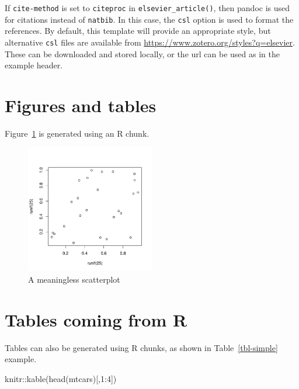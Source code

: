 \documentclass[
  authoryear,
  preprint,
  3p]{elsarticle}
\newenvironment{Shaded}{\begin{snugshade}}{\end{snugshade}}
\newcommand{\DecValTok}[1]{\textcolor[rgb]{0.68,0.00,0.00}{#1}}
\newcommand{\FunctionTok}[1]{\textcolor[rgb]{0.28,0.35,0.67}{#1}}
\newcommand{\NormalTok}[1]{\textcolor[rgb]{0.00,0.23,0.31}{#1}}
\newcommand{\SpecialCharTok}[1]{\textcolor[rgb]{0.37,0.37,0.37}{#1}}
\begin{document}
If \texttt{cite-method} is set to \texttt{citeproc} in
\texttt{elsevier\_article()}, then pandoc is used for citations instead
of \texttt{natbib}. In this case, the \texttt{csl} option is used to
format the references. By default, this template will provide an
appropriate style, but alternative \texttt{csl} files are available from
\url{https://www.zotero.org/styles?q=elsevier}. These can be downloaded
and stored locally, or the url can be used as in the example header.

\hypertarget{figures-and-tables}{%
\section{Figures and tables}\label{figures-and-tables}}

Figure~\ref{fig-meaningless} is generated using an R chunk.

\begin{figure}

{\centering \includegraphics[width=0.5\textwidth,height=\textheight]{manuscript_files/figure-pdf/fig-meaningless-1.pdf}

}

\caption{\label{fig-meaningless}A meaningless scatterplot}

\end{figure}

\hypertarget{tables-coming-from-r}{%
\section{Tables coming from R}\label{tables-coming-from-r}}

Tables can also be generated using R chunks, as shown in
Table~\ref{tbl-simple} example.

\begin{Shaded}
\begin{Highlighting}[]
\NormalTok{knitr}\SpecialCharTok{::}\FunctionTok{kable}\NormalTok{(}\FunctionTok{head}\NormalTok{(mtcars)[,}\DecValTok{1}\SpecialCharTok{:}\DecValTok{4}\NormalTok{])}
\end{Highlighting}
\end{Shaded}
\end{document}

